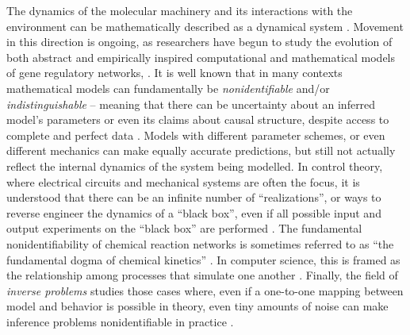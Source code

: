 \documentclass{article}
\newcommand{\1}{\mathbbm{1}}
\begin{document}
The dynamics of the molecular machinery and its interactions with the environment
can be mathematically described as a dynamical system \citep{jaeger2015comet}.
Movement in this direction is ongoing, as researchers have begun to study 
the evolution of both abstract \citep{wagner1994evolution, wagner1996does, siegal2002waddington, bergman2003evolutionary, draghi2015robustness} 
and empirically inspired computational and mathematical models of gene regulatory networks,
\citep[e.g.][]{mjolsness1991connectionist, jaeger2004dynamic, maria1, vitaly1, vitaly2, crombach2016gap, wotton2015quantitative, chertkova2017insilico}.
It is well known that in many contexts mathematical models
can fundamentally be \emph{nonidentifiable} and/or \emph{indistinguishable} -- meaning that 
there can be uncertainty about an inferred model's parameters or even its claims about
causal structure, despite access to complete and perfect data \citep{bellman1970structural, grewal1976identifiability, walter1984structural}. 
Models with different parameter schemes, or even different mechanics 
can make equally accurate predictions,
but still not actually reflect the internal dynamics of the system being modelled.
In control theory, where electrical circuits and mechanical systems are often the focus, 
it is understood that there can be an infinite number of ``realizations'', 
or ways to reverse engineer the dynamics of a ``black box'',
even if all possible input and output experiments on the ``black box'' are performed 
\citep{kalman1963mathematical, anderson1966equivalence, zadeh1976linear}. 
The fundamental nonidentifiability of chemical reaction networks is sometimes referred to as ``the fundamental dogma of chemical kinetics'' \citep{craciun2008identifiability}. 
In computer science, this is framed as the relationship among processes that simulate one another \citep{van2004equivalence}.
Finally,
the field of \emph{inverse problems} studies those cases where,
even if a one-to-one mapping between model and behavior is possible in theory,
even tiny amounts of noise can make inference problems nonidentifiable in practice \citep{petrov2005well}.
\end{document}
